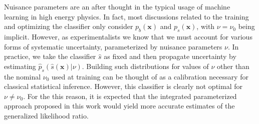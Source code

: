 \documentclass[12pt]{article}
\numberwithin{equation}{section}
\theoremstyle{plain}
\begin{document}




Nuisance parameters are an after thought in the typical usage of machine
learning in high energy physics. In fact, most discussions related to the training and
optimizing the classifier only consider $p_b(\mathbf{x})$ and $p_s(\mathbf{x})$, with $\nu=\nu_0$
being implicit. However, as experimentalists we know that we must account for
various forms of systematic uncertainty, parameterized by nuisance parameters
$\nu$. In practice, we take the classifier $\hat s$ as fixed and then propagate
uncertainty by estimating $\hat{p}_s(\hat s(\mathbf{x}) | \nu)$. Building such
distributions for values of $\nu$ other than the nominal $\nu_0$
used at training can be thought of as a calibration necessary for
classical statistical inference. However, this classifier is clearly not optimal
for $\nu \ne \nu_0$. For the this reason, it is expected that the integrated parameterized approach proposed in this work
would yield more accurate estimates of the generalized likelihood ratio.
\end{document}
